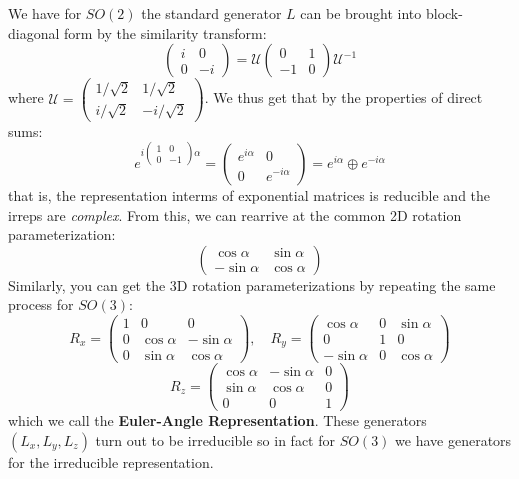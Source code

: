 \documentclass[9pt]{article}
\begin{document}
\begin{multicols}{2}
We have for $SO(2)$ the standard generator $L$ can be brought into
block-diagonal form by the similarity transform:
\begin{equation}
    \begin{pmatrix}
        i & 0 \\ 0 & -i
    \end{pmatrix} = \mathcal{U} \begin{pmatrix}
        0 & 1 \\ -1 & 0 
    \end{pmatrix} \mathcal{U}^{-1}
\end{equation}
where $\mathcal{U} = \begin{pmatrix}
    1/\sqrt{2} & 1/\sqrt{2} \\
    i/\sqrt{2} & -i/\sqrt{2}
\end{pmatrix}$. We thus get that by the properties of direct sums:
\begin{equation}
    e^{i \begin{pmatrix} 1 & 0 \\ 0 & -1 \end{pmatrix} \alpha}
= \begin{pmatrix} e^{i\alpha} & 0 \\ 0 & e^{-i\alpha} \end{pmatrix}
= e^{i\alpha} \oplus e^{-i\alpha}
\end{equation}
that is, the representation interms of exponential matrices is 
reducible and the irreps are \textit{complex}. From this, we can
rearrive at the common 2D rotation parameterization:
$$\begin{pmatrix}
    \cos\alpha & \sin\alpha \\
    -\sin\alpha & \cos\alpha
\end{pmatrix}$$
Similarly, you can get the 3D rotation parameterizations by repeating the same process for $SO(3)$:
$$
    R_x =
\begin{pmatrix}
1 & 0 & 0 \\
0 & \cos\alpha & -\sin\alpha \\
0 & \sin\alpha & \cos\alpha
\end{pmatrix}, \quad
R_y =
\begin{pmatrix}
\cos\alpha & 0 & \sin\alpha \\
0 & 1 & 0 \\
-\sin\alpha & 0 & \cos\alpha
\end{pmatrix}$$
$$
R_z =
\begin{pmatrix}
\cos\alpha & -\sin\alpha & 0 \\
\sin\alpha & \cos\alpha & 0 \\
0 & 0 & 1
\end{pmatrix}
$$
which we call the \textbf{Euler-Angle Representation}. These generators $(L_x,L_y,L_z)$ turn out to be irreducible so in
fact for $SO(3)$ we have generators for the irreducible 
representation. 


\end{multicols}
\end{document}
